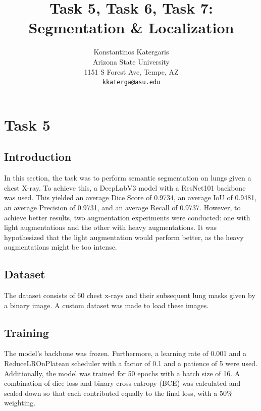 \documentclass[10pt,twocolumn,letterpaper]{article}
\begin{document}
\title{Task 5, Task 6, Task 7: Segmentation \& Localization }

\author{Konstantinos Katergaris\\
Arizona State University\\
1151 S Forest Ave, Tempe, AZ\\
{\tt\small kkaterga@asu.edu}}


\maketitle

\section{Task 5}

\subsection{Introduction}
In this section, the task was to perform semantic segmentation on lungs given a chest X-ray. To achieve this, a DeepLabV3 model with a ResNet101 backbone was used. This yielded an average Dice Score of 0.9734, an average IoU of 0.9481, an average Precision of 0.9731, and an average Recall of 0.9737. However, to achieve better results, two augmentation experiments were conducted: one with light augmentations and the other with heavy augmentations. It was hypothesized that the light augmentation would perform better, as the heavy augmentations might be too intense.
\subsection{Dataset}
The dataset\cite{DatasetForClass} consists of 60 chest x-rays and their subsequent lung masks given by a binary image. A custom dataset was made to load these images.

\subsection{Training}
The model's backbone was frozen. Furthermore, a learning rate of 0.001 and a ReduceLROnPlateau scheduler with a factor of 0.1 and a patience of 5 were used. Additionally, the model was trained for 50 epochs with a batch size of 16. A combination of dice loss and binary cross-entropy (BCE) was calculated and scaled down so that each contributed equally to the final loss, with a 50\% weighting.
\end{document}
